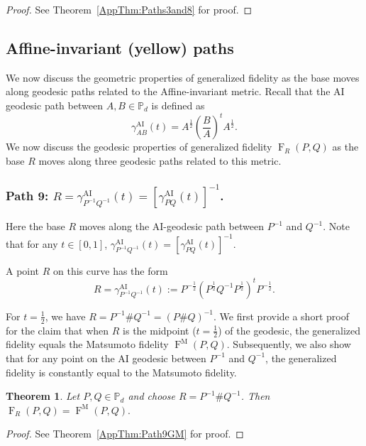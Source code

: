\documentclass[12pt]{article}
\newtheorem{theorem}{Theorem}[section] %
\theoremstyle{definition}
\begin{document}
\begin{proof}
    See Theorem~\ref{AppThm:Paths3and8} for proof. 
\end{proof}

    
\subsection{Affine-invariant (yellow) paths}
We now discuss the geometric properties of generalized fidelity as the base moves along geodesic paths related to the Affine-invariant metric. Recall that the AI geodesic path between $A,B \in \mathbb P_d$ is defined as 
\begin{equation}
    \gamma_{AB}^\text{AI}(t) = A ^{\frac12} \left(\frac{B}{A} \right)^t A ^{\frac12}.     
\end{equation}
We now discuss the geodesic properties of generalized fidelity $\operatorname{F}_R(P,Q) $ as the base $R$ moves along three geodesic paths related to this metric.

\subsubsection*{Path 9: $R = \gamma^\mathrm{AI}_{P^{-1} Q^{-1}}(t) = \left[\gamma^\mathrm{AI}_{P Q}(t)\right]^{-1}$.}
Here the base $R$ moves along the AI-geodesic path between $P^{-1}$ and $Q^{-1}$. Note that for any $t \in [0,1]$,
$ \gamma^\mathrm{AI}_{P ^{-1} Q ^{-1} } (t) = [\gamma^\mathrm{AI}_{P Q} (t)]^{-1}.  $

A point $R$ on this curve has the form
\begin{equation}
R = \gamma^\mathrm{AI}_{P^{-1} Q^{-1}}(t) := P^{-\frac 12} \left(P^{\frac 12} Q ^{-1}  P^{\frac 12}\right)^t P^{-\frac 12}.
\end{equation}

For $t = \frac12$, we have $R = P ^{-1} \# Q ^{-1}  = (P \# Q) ^{-1} $. We first provide a short proof for the claim that when $R$ is the midpoint ($t=\frac12$) of the geodesic, the generalized fidelity equals the Matsumoto fidelity $\operatorname{F}^\mathrm M(P,Q) $. Subsequently, we also show that for any point on the AI geodesic between $P ^{-1} $ and $Q ^{-1} $, the generalized fidelity is constantly equal to the Matsumoto fidelity.


\begin{theorembox}
\begin{theorem} \label{Thm:Path9GM}
Let $P,Q \in \mathbb{P}_d$ and choose $R = P^{-1} \# Q^{-1}$. Then $\operatorname{F}_R(P,Q) = \operatorname{F}^\mathrm{M}(P,Q).$
\end{theorem}
\label{Thm:MatsFidelityatGeoMean}
\end{theorembox}
\begin{proof}
    See Theorem~\ref{AppThm:Path9GM} for proof.
\end{proof}
\end{document}

